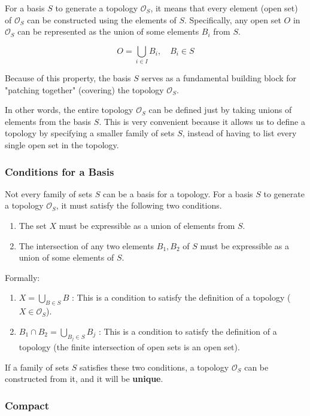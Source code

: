 \documentclass[article,letterpaper,12pt]{jsarticle}
\begin{document}
For a basis $S$ to generate a topology $\mathcal{O}_S$, it means that every element (open set) of $\mathcal{O}_S$ can be constructed using the elements of $S$.
Specifically, any open set $O$ in $\mathcal{O}_S$ can be represented as the union of some elements $B_i$ from $S$.

$$O = \bigcup_{i \in I} B_i, \quad B_i \in S$$

Because of this property, the basis $S$ serves as a fundamental building block for "patching together" (covering) the topology $\mathcal{O}_S$.

In other words, the entire topology $\mathcal{O}_S$ can be defined just by taking unions of elements from the basis $S$.
This is very convenient because it allows us to define a topology by specifying a smaller family of sets $S$, instead of having to list every single open set in the topology.

\subsubsection{Conditions for a Basis}

Not every family of sets $S$ can be a basis for a topology.
For a basis $S$ to generate a topology $\mathcal{O}_S$, it must satisfy the following two conditions.

\begin{enumerate}
	\item The set $X$ must be expressible as a union of elements from $S$.
	\item The intersection of any two elements $B_1, B_2$ of $S$ must be expressible as a union of some elements of $S$.
\end{enumerate}

Formally:

\begin{enumerate}
	\item $X = \bigcup_{B \in S} B$ : This is a condition to satisfy the definition of a topology ($X \in \mathcal{O}_S$).
	\item $B_1 \cap B_2 = \bigcup_{B_j \in S} B_j$ : This is a condition to satisfy the definition of a topology (the finite intersection of open sets is an open set).
\end{enumerate}

If a family of sets $S$ satisfies these two conditions, a topology $\mathcal{O}_S$ can be constructed from it, and it will be \textbf{unique}.

\subsubsection{Compact}
\end{document}
